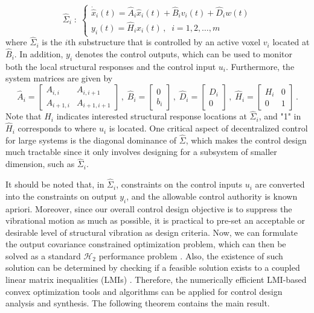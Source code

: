 \documentclass[11pt]{ucthesis}
\begin{document}
\begin{equation}
\hat{\Sigma}_i\;:\; \left \{
\begin{array}{l}
\dot{\hat{x}}_i (t) = \hat{A}_i \hat{x}_i (t) + \hat{B}_i v_i (t) + \hat{D}_i w(t) \\
y_i (t) = \hat{H}_i x_i (t) \,,\;\; i = 1,2,\dots, m
\end{array}
\right .
\label{eqn:sys}
\end{equation}
where $\hat{\Sigma}_i$ is the $i$th substructure that is controlled by an active voxel $v_i$ located at $\hat{B}_i$. In addition, $y_i$ denotes the control outputs, which can be used to monitor both the local structural responses and the control input $u_i$. Furthermore, the system matrices are given by
\[
\hat{A}_i = \left [
\begin{array}{cc}
A_{i,i} & A_{i,i+1} \\
A_{i+1,i} & A_{i+1,i+1}
\end{array}
\right ] \,,\;\hat{B}_i = \left [
\begin{array}{c}
0 \\
b_i
\end{array}
\right ] \,,\;\hat{D}_i = \left [
\begin{array}{c}
D_i \\
0
\end{array}
\right ] \,,\;\hat{H}_i = \left [
\begin{array}{cc}
H_i & 0 \\
0& 1
\end{array}
\right ] \,.
\]
Note that $H_i$ indicates interested structural response locations at $\hat{\Sigma}_i$, and "1" in $\hat{H}_i$ corresponds to where $u_i$ is located. One critical aspect of decentralized control for large systems is the diagonal dominance of $\hat{\Sigma}$, which makes the control design much tractable since it only involves designing for a subsystem of smaller dimension, such as $\hat{\Sigma}_i$. 

It should be noted that, in $\hat{\Sigma}_i$, constraints on the control inputs $u_i$ are converted into the constraints on output $y_i$, and the allowable control authority is known apriori. Moreover, since our overall control design objective is to suppress the vibrational motion as much as possible, it is practical to pre-set an acceptable or desirable level of structural vibration as design criteria. Now, we can formulate the output covariance constrained optimization problem, which can then be solved as a standard $\mathcal{H}_2$ performance problem \cite{zhu1997convergent}. Also, the existence of such solution can be determined by checking if a feasible solution exists to a coupled linear matrix inequalities (LMIs) \cite{swei2015lmi}. Therefore, the numerically efficient LMI-based convex optimization tools and algorithms can be applied for control design analysis and synthesis. The following theorem contains the main result.
\end{document}
